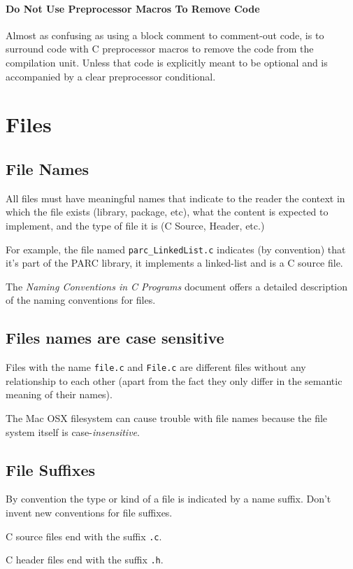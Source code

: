 \documentclass[fleqn,12pt]{PARCOneColumn} %
\begin{document}
\paragraph{Do Not Use Preprocessor Macros To Remove Code} 
Almost as confusing as using a block comment to comment-out code,
is to surround code with C preprocessor macros to remove the code from the compilation unit.
Unless that code is explicitly meant to be optional and is accompanied by a clear preprocessor conditional.
\section{Files}

\subsection{File Names}
All files must have meaningful names that indicate to the reader the
context in which the file exists (library, package, etc), what the content
is expected to implement, and the type of file it is (C Source, Header, etc.)

For example, the file named {\tt parc\_LinkedList.c} indicates (by convention)
that it's part of the PARC library, it implements a linked-list and is a C source file.

The \textit{Naming Conventions in C Programs} document offers a detailed description of the naming conventions for files.

\subsection{Files names are case sensitive}
Files with the name {\tt file.c} and {\tt File.c} are different files without any relationship to each other
(apart from the fact they only differ in the semantic meaning of their names).

The Mac OSX filesystem can cause trouble with file names because the file system itself is case-{\it insensitive}.

\subsection{File Suffixes}
By convention the type or kind of a file is indicated by a name suffix.
Don't invent new conventions for file suffixes.

C source files end with the suffix {\tt .c}.

C header files end with the suffix {\tt .h}.
\end{document}
